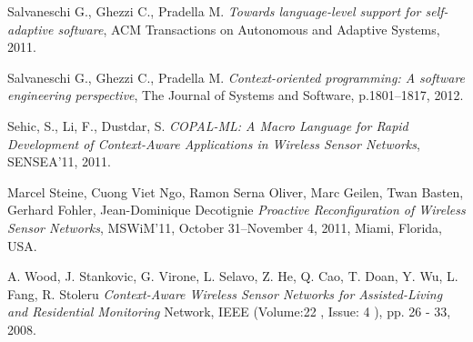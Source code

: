 \begin{thebibliography}{1}
Salvaneschi G., Ghezzi C., Pradella M.
\emph{Towards language-level support for self-adaptive software},
ACM Transactions on Autonomous and Adaptive Systems, 2011.

Salvaneschi G., Ghezzi C., Pradella M. 
\emph{Context-oriented  programming:  A  software  engineering  perspective},
The  Journal  of  Systems  and  Software, p.1801–1817, 2012.

Sehic, S., Li, F., Dustdar, S. \emph{COPAL-ML: A Macro Language for Rapid Development of Context-Aware Applications in Wireless Sensor Networks}, 
SENSEA'11, 2011.

Marcel Steine, Cuong Viet Ngo, Ramon Serna Oliver, Marc Geilen, Twan Basten, Gerhard Fohler, Jean-Dominique Decotignie 
\emph{Proactive Reconﬁguration of Wireless Sensor Networks},
MSWiM’11, October 31–November 4, 2011, Miami, Florida, USA.

A. Wood, J. Stankovic, G. Virone, L. Selavo, Z. He, Q. Cao, T. Doan, Y. Wu, L. Fang, R. Stoleru 
\emph{Context-Aware Wireless Sensor Networks for Assisted-Living and Residential Monitoring}
Network, IEEE  (Volume:22 ,  Issue: 4 ), pp. 26 - 33, 2008.

\end{thebibliography}
